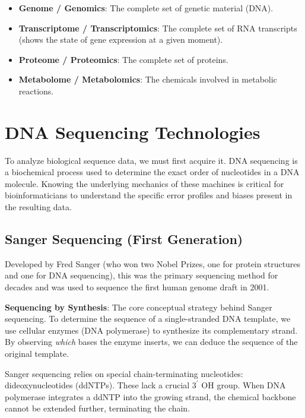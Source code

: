 \begin{itemize}
  \item \textbf{Genome / Genomics}: The complete set of genetic material (DNA).
  \item \textbf{Transcriptome / Transcriptomics}: The complete set of RNA transcripts (shows the state of gene expression at a given moment).
  \item \textbf{Proteome / Proteomics}: The complete set of proteins.
  \item \textbf{Metabolome / Metabolomics}: The chemicals involved in metabolic reactions.
\end{itemize}

\section{DNA Sequencing Technologies}

To analyze biological sequence data, we must first acquire it. DNA sequencing is a biochemical process used to determine the exact order of nucleotides in a DNA molecule. Knowing the underlying mechanics of these machines is critical for bioinformaticians to understand the specific error profiles and biases present in the resulting data.

\subsection{Sanger Sequencing (First Generation)}
Developed by Fred Sanger (who won two Nobel Prizes, one for protein structures and one for DNA sequencing), this was the primary sequencing method for decades and was used to sequence the first human genome draft in 2001.

\begin{important}
  \textbf{Sequencing by Synthesis}: The core conceptual strategy behind Sanger sequencing. To determine the sequence of a single-stranded DNA template, we use cellular enzymes (DNA polymerase) to synthesize its complementary strand. By observing \textit{which} bases the enzyme inserts, we can deduce the sequence of the original template.
\end{important}

Sanger sequencing relies on special chain-terminating nucleotides: dideoxynucleotides (ddNTPs). These lack a crucial $3^{\prime}$ OH group. When DNA polymerase integrates a ddNTP into the growing strand, the chemical backbone cannot be extended further, terminating the chain.

